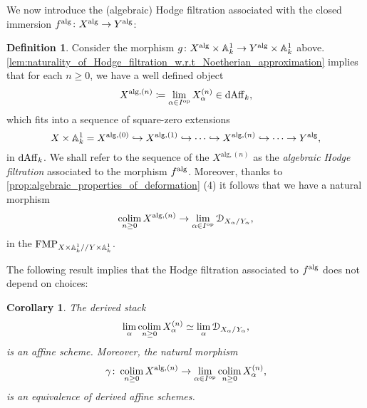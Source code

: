 \documentclass[10pt,a4paper,reqno]{amsart} %
\theoremstyle{plain}
\newtheorem{cor}[thm]{Corollary}
\theoremstyle{definition}
\newtheorem{defin}[thm]{Definition}
\theoremstyle{remark}
\numberwithin{equation}{section}
\begin{document}
We now introduce the (algebraic) Hodge filtration associated with the closed immersion $f^\mathrm{alg} \colon X^\mathrm{alg} \to Y^\mathrm{alg}$:

\begin{defin} \label{defin:algebraic_Hodge_filtration}
    Consider the morphism $g \colon X^\mathrm{alg} \times \mathbb A^1_k \to Y^\mathrm{alg} \times \mathbb A^1_k$ above. \cref{lem:naturality_of_Hodge_filtration_w.r.t_Noetherian_approximation}
    implies that for each $n \ge 0$, we have a well defined object
        \[
            X^{\mathrm{alg}, (n)} \coloneqq \lim_{\alpha \in I^\mathrm{op}} X_\alpha^{(n)} \in \mathrm{dAff}_k,  
        \]
    which fits into a sequence of square-zero extensions
        \[
            X\times \mathbb A^1_k = X^{ \mathrm{alg}, (0)} \hookrightarrow X^{\mathrm{alg}, (1)}  \hookrightarrow \dots \hookrightarrow X^{\mathrm{alg}, (n)} \hookrightarrow \dots \to Y^\mathrm{alg},
        \]
    in $\mathrm{dAff}_k$. We shall refer to the sequence of the $X^{\mathrm{alg}, (n)}$ as the \emph{algebraic Hodge filtration} associated to the morphism $f^\mathrm{alg}$. Moreover, thanks to
    \cref{prop:algebraic_properties_of_deformation} (4) it follows that we have a natural morphism
        \begin{equation} \label{eq:map_Hodge_filtration_to_deformation}
            \operatorname*{colim}_{n \ge 0} X^{\mathrm{alg}, (n)} \to \lim_{\alpha \in I^\mathrm{op}} \mathcal D_{X_\alpha/ Y_\alpha},  
        \end{equation}
    in the \infcat $\mathrm{FMP}_{X \times \mathbb A^1_k/ /Y \times \mathbb A^1_k}$.
\end{defin}

The following result implies that the Hodge filtration associated to $f^\mathrm{alg}$ does not depend on choices:

\begin{cor} \label{cor:commutation_between_limit_and_colimit_on_Hodge_filtration}
    The derived stack 
        \[\lim_{\alpha} \operatorname*{colim}_{n \ge 0} X_\alpha^{(n)} \simeq \lim_{\alpha} \mathcal D_{X_\alpha/ Y_\alpha},\]
    is an affine scheme. Moreover, the natural morphism
        \[
            \gamma \colon \operatorname*{colim}_{n \ge 0} X^{\mathrm{alg}, (n)} \to \lim_{\alpha \in I ^\mathrm{op}} \operatorname*{colim}_{n \ge 0} X^{(n)}_\alpha,
        \] 
    is an equivalence of derived affine schemes.
\end{cor}
\end{document}
